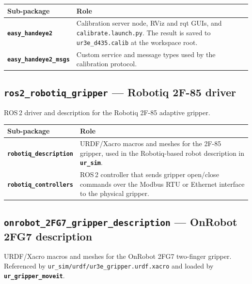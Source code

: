 \documentclass[11pt,a4paper]{article}
\newcommand{\pkg}[1]{\texttt{\textbf{#1}}}
\newcommand{\file}[1]{\texttt{#1}}
\begin{document}
\begin{center}
\begin{tabular}{|l|p{9cm}|}
\hline
\textbf{Sub-package} & \textbf{Role} \\
\hline
\pkg{easy\_handeye2} &
  Calibration server node, RViz and rqt GUIs, and \file{calibrate.launch.py}.
  The result is saved to \file{ur3e\_d435.calib} at the workspace root. \\
\hline
\pkg{easy\_handeye2\_msgs} &
  Custom service and message types used by the calibration protocol. \\
\hline
\end{tabular}
\end{center}

\subsection{\texttt{ros2\_robotiq\_gripper} --- Robotiq 2F-85 driver}

ROS\,2 driver and description for the Robotiq 2F-85 adaptive gripper.

\begin{center}
\begin{tabular}{|l|p{9cm}|}
\hline
\textbf{Sub-package} & \textbf{Role} \\
\hline
\pkg{robotiq\_description} &
  URDF/Xacro macros and meshes for the 2F-85 gripper, used in the
  Robotiq-based robot description in \pkg{ur\_sim}. \\
\hline
\pkg{robotiq\_controllers} &
  ROS\,2 controller that sends gripper open/close commands over the
  Modbus RTU or Ethernet interface to the physical gripper. \\
\hline
\end{tabular}
\end{center}

\subsection{\texttt{onrobot\_2FG7\_gripper\_description} --- OnRobot 2FG7 description}

URDF/Xacro macros and meshes for the OnRobot 2FG7 two-finger gripper.
Referenced by \file{ur\_sim/urdf/ur3e\_gripper.urdf.xacro} and loaded by
\pkg{ur\_gripper\_moveit}.
\end{document}
